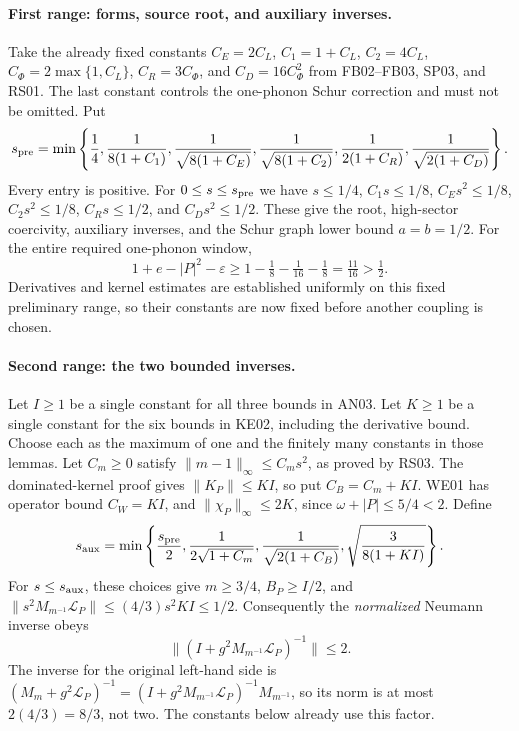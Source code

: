 \documentclass[11pt,a4paper]{article}
\theoremstyle{remark}\newtheorem{remark}[theorem]{Remark}
\begin{document}
\paragraph{First range: forms, source root, and auxiliary inverses.}
Take the already fixed constants $C_E=2C_L$, $C_1=1+C_L$, $C_2=4C_L$, $C_\Phi=2\max\{1,C_L\}$, $C_R=3C_\Phi$, and $C_D=16C_\Phi^2$ from FB02--FB03, SP03, and RS01. The last constant controls the one-phonon Schur correction and must not be omitted. Put
\[
 s_{\rm pre}=\min\left\{\frac14,\frac1{8(1+C_1)},
 \frac1{\sqrt{8(1+C_E)}},\frac1{\sqrt{8(1+C_2)}},
 \frac1{2(1+C_R)},\frac1{\sqrt{2(1+C_D)}}\right\}.
\]
Every entry is positive. For $0\leq s\leq s_{\rm pre}$ we have
$s\leq1/4$, $C_1s\leq1/8$, $C_Es^2\leq1/8$, $C_2s^2\leq1/8$, $C_Rs\leq1/2$, and $C_Ds^2\leq1/2$. These give the root, high-sector coercivity, auxiliary inverses, and the Schur graph lower bound $a=b=1/2$. For the entire required one-phonon window,
\[
 1+e-|P|^2-\varepsilon
 \geq1-\tfrac18-\tfrac1{16}-\tfrac18=\tfrac{11}{16}>\tfrac12.
\]
Derivatives and kernel estimates are established uniformly on this fixed preliminary range, so their constants are now fixed before another coupling is chosen.

\paragraph{Second range: the two bounded inverses.}
Let $I\geq1$ be a single constant for all three bounds in AN03. Let $K\geq1$ be a single constant for the six bounds in KE02, including the derivative bound. Choose each as the maximum of one and the finitely many constants in those lemmas. Let $C_m\geq0$ satisfy $\|m-1\|_\infty\leq C_m s^2$, as proved by RS03. The dominated-kernel proof gives $\|K_P\|\leq KI$, so put $C_B=C_m+KI$. WE01 has operator bound $C_W=KI$, and $\|\chi_P\|_\infty\leq2K$, since $\omega+|P|\leq5/4<2$. Define
\[
 s_{\rm aux}=\min\left\{\frac{s_{\rm pre}}2,
 \frac1{2\sqrt{1+C_m}},\frac1{\sqrt{2(1+C_B)}},
 \sqrt{\frac3{8(1+KI)}}\right\}.
\]
For $s\leq s_{\rm aux}$, these choices give $m\geq3/4$, $B_P\geq I/2$, and
$\|s^2M_{m^{-1}}\mathscr L_P\|\leq(4/3)s^2KI\leq1/2$.
Consequently the \emph{normalized} Neumann inverse obeys
\[
 \|(I+g^2M_{m^{-1}}\mathscr L_P)^{-1}\|\leq2.
\]
The inverse for the original left-hand side is
$(M_m+g^2\mathscr L_P)^{-1}=(I+g^2M_{m^{-1}}\mathscr L_P)^{-1}M_{m^{-1}}$, so its norm is at most $2(4/3)=8/3$, not two. The constants below already use this factor.
\end{document}
